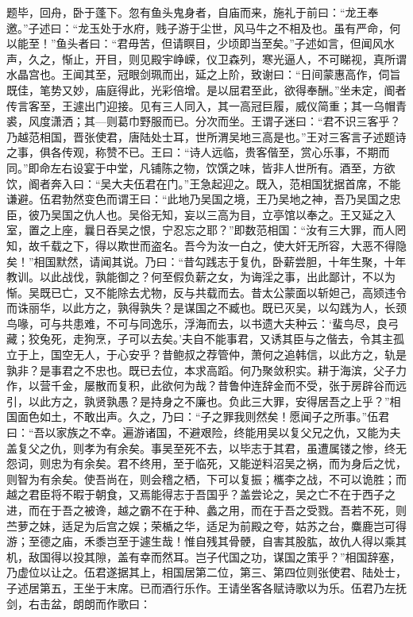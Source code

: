\documentclass[a4paper,12pt,UTF8,twoside]{ctexbook}
\begin{document}
题毕，回舟，卧于蓬下。忽有鱼头鬼身者，自庙而来，施礼于前曰：“龙王奉邀。”子述曰：“龙玉处于水府，贱子游于尘世，风马牛之不相及也。虽有严命，何以能至！”鱼头者曰：“君毋苦，但请瞑目，少顷即当至矣。”子述如言，但闻风水声，久之，惭止，开目，则见殿宇峥嵘，仪卫森列，寒光逼人，不可睇视，真所谓水晶宫也。王闻其至，冠眼剑珮而出，延之上阶，致谢曰：“日间蒙惠高作，伺旨既佳，笔势又妙，庙庭得此，光彩倍增。是以屈君至此，欲得奉酬。”坐未定，阍者传言客至，王遽出门迎接。见有三人同入，其一高冠巨履，威仪简重；其一乌帽青裘，风度潇洒；其—则葛巾野服而已。分次而坐。王谓子迷曰：“君不识三客乎？乃越范相国，晋张使君，唐陆处士耳，世所渭吴地三高是也。”王对三客言子述题诗之事，俱各传观，称赞不已。王曰：“诗人远临，贵客偕至，赏心乐事，不期而同。”即命左右设宴于中堂，凡铺陈之物，饮馔之味，皆非人世所有。酒至，方欲饮，阍者奔入曰：“吴大夫伍君在门。”王急起迎之。既入，范相国犹据首席，不能谦避。伍君勃然变色而谓王曰：“此地乃吴国之境，王乃吴地之神，吾乃吴国之忠臣，彼乃吴国之仇人也。吴俗无知，妄以三高为目，立亭馆以奉之。王又延之入室，置之上座，曩日吞吴之恨，宁忍忘之耶？”即数范相国：“汝有三大罪，而人罔知，故千载之下，得以欺世而盗名。吾今为汝一白之，使大奸无所容，大恶不得隐矣！”相国默然，请闻其说。乃曰：“昔勾践志于复仇，卧薪尝胆，十年生聚，十年教训。以此战伐，孰能御之？何至假负薪之女，为诲淫之事，出此鄙计，不以为惭。吴既已亡，又不能除去尤物，反与共载而去。昔太公蒙面以斩妲己，高颎违令而诛丽华，以此方之，孰得孰失？是谋国之不臧也。既已灭吴，以勾践为人，长颈鸟喙，可与共患难，不可与同逸乐，浮海而去，以书遗大夫种云：‘蜚鸟尽，良弓藏；狡兔死，走狗烹，子可以去矣。’夫自不能事君，又诱其臣与之偕去，令其主孤立于上，国空无人，于心安乎？昔鲍叔之荐管仲，萧何之追韩信，以此方之，轨是孰非？是事君之不忠也。既已去位，本求高蹈。何乃聚敛积实。耕于海滨，父子力作，以营千金，屡散而复积，此欲何为哉？昔鲁仲连辞金而不受，张于房辟谷而远引，以此方之，孰贤孰愚？是持身之不廉也。负此三大罪，安得居吾之上乎？”相国面色如土，不敢出声。久之，乃曰：“子之罪我则然矣！愿闻子之所事。”伍君曰：“吾以家族之不幸。遍游诸国，不避艰险，终能用吴以复父兄之仇，又能为夫盖复父之仇，则孝为有余矣。事吴至死不去，以毕志于其君，虽遭属镂之惨，终无怨词，则忠为有余矣。君不终用，至于临死，又能逆料沼吴之祸，而为身后之忧，则智为有余矣。使吾尚在，则会稽之栖，下可以复振；欈李之战，不可以诡胜；而越之君臣将不暇于朝食，又焉能得志于吾国乎？盖尝论之，吴之亡不在于西子之进，而在于吾之被谗，越之霸不在于种、蠡之用，而在于吾之受戮。吾若不死，则苎萝之妹，适足为后宫之娱；荣楯之华，适足为前殿之夸，姑苏之台，麋鹿岂可得游；至德之庙，禾黍岂至于遽生哉！惟自残其骨骾，自害其股肱，故仇人得以乘其机，敌国得以投其隙，盖有幸而然耳。岂子代国之功，谋国之策乎？”相国辞塞，乃虚位以让之。伍君遂据其上，相国居第二位，第三、第四位则张使君、陆处士，子述居第五，王坐于末席。已而酒行乐作。王请坐客各赋诗歌以为乐。伍君乃左抚剑，右击盆，朗朗而作歌曰：
\end{document}
